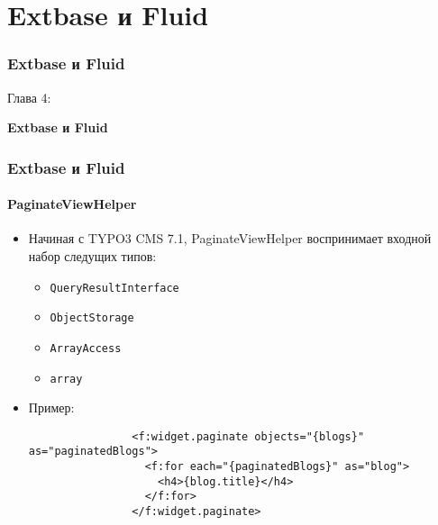 %

\section{Extbase и Fluid}
\begin{frame}[fragile]
	\frametitle{Extbase и Fluid}

	\begin{center}\huge{Глава 4:}\end{center}
	\begin{center}\huge{\color{typo3darkgrey}\textbf{Extbase и Fluid}}\end{center}

\end{frame}


\begin{frame}[fragile]
	\frametitle{Extbase и Fluid}
	\framesubtitle{PaginateViewHelper}

	\begin{itemize}

		\item Начиная с TYPO3 CMS 7.1, PaginateViewHelper воспринимает входной набор следущих типов:

			\begin{itemize}
				\item \texttt{QueryResultInterface}
				\item \texttt{ObjectStorage}
				\item \texttt{ArrayAccess}
				\item \texttt{array}
			\end{itemize}

		\item Пример:

			\begin{lstlisting}
				<f:widget.paginate objects="{blogs}" as="paginatedBlogs">
				  <f:for each="{paginatedBlogs}" as="blog">
				    <h4>{blog.title}</h4>
				  </f:for>
				</f:widget.paginate>
			\end{lstlisting}

	\end{itemize}

\end{frame}

